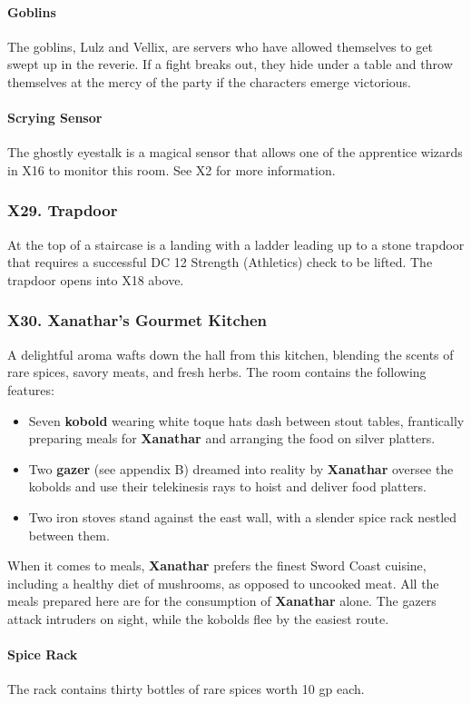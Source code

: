 \documentclass[10pt,a4paper,twoside,twocolumn,openany,nodeprecatedcode]{dndbook}
\begin{document}
\paragraph{Goblins}
The goblins, Lulz and Vellix, are servers who have allowed themselves to get swept up in the reverie. If a fight breaks out, they hide under a table and throw themselves at the mercy of the party if the characters emerge victorious.
\paragraph{Scrying Sensor}
The ghostly eyestalk is a magical sensor that allows one of the apprentice wizards in X16 to monitor this room. See X2 for more information.
\subsubsection{X29. Trapdoor}
At the top of a staircase is a landing with a ladder leading up to a stone trapdoor that requires a successful DC 12 Strength (Athletics) check to be lifted. The trapdoor opens into X18 above.
\subsubsection{X30. Xanathar's Gourmet Kitchen}
A delightful aroma wafts down the hall from this kitchen, blending the scents of rare spices, savory meats, and fresh herbs. The room contains the following features:
\begin{itemize}

\item Seven \textbf{kobold} wearing white toque hats dash between stout tables, frantically preparing meals for \textbf{Xanathar} and arranging the food on silver platters.
\item Two \textbf{gazer} (see appendix B) dreamed into reality by \textbf{Xanathar} oversee the kobolds and use their telekinesis rays to hoist and deliver food platters.
\item Two iron stoves stand against the east wall, with a slender spice rack nestled between them.
\end{itemize}


When it comes to meals, \textbf{Xanathar} prefers the finest Sword Coast cuisine, including a healthy diet of mushrooms, as opposed to uncooked meat. All the meals prepared here are for the consumption of \textbf{Xanathar} alone.
The gazers attack intruders on sight, while the kobolds flee by the easiest route.
\paragraph{Spice Rack}
The rack contains thirty bottles of rare spices worth 10 gp each.
\end{document}
